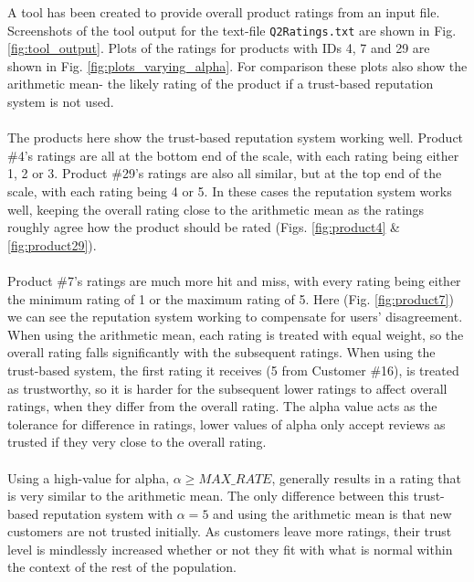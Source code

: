 \documentclass{article}
\begin{document}
A tool has been created to provide overall product ratings from an input file. Screenshots of the tool output for the text-file \texttt{Q2Ratings.txt} are shown in Fig. \ref{fig:tool_output}.
Plots of the ratings for products with IDs 4, 7 and 29 are shown in Fig. \ref{fig:plots_varying_alpha}. For comparison these plots also show the arithmetic mean- the likely rating of the product if a trust-based reputation system is not used.
\\\\
The products here show the trust-based reputation system working well.
Product \#4's ratings are all at the bottom end of the scale, with each rating being either 1, 2 or 3. 
Product \#29's ratings are also all similar, but at the top end of the scale, with each rating being 4 or 5.
In these cases the reputation system works well, keeping the overall rating close to the arithmetic mean as the ratings roughly agree how the product should be rated (Figs. \ref{fig:product4} \& \ref{fig:product29}).
\\\\
Product \#7's ratings are much more hit and miss, with every rating being either the minimum rating of 1 or the maximum rating of 5.
Here (Fig. \ref{fig:product7}) we can see the reputation system working to compensate for users' disagreement.
When using the arithmetic mean, each rating is treated with equal weight, so the overall rating falls significantly with the subsequent ratings.
When using the trust-based system, the first rating it receives (5 from Customer \#16), is treated as trustworthy, so it is harder for the subsequent lower ratings to affect overall ratings, when they differ from the overall rating.
The alpha value acts as the tolerance for difference in ratings, lower values of alpha only accept reviews as trusted if they very close to the overall rating.
\\\\
Using a high-value for alpha, $\alpha \geqslant MAX\_RATE$, generally results in a rating that is very similar to the arithmetic mean. The only difference between this trust-based reputation system with $\alpha = 5$ and using the arithmetic mean is that new customers are not trusted initially. As customers leave more ratings, their trust level is mindlessly increased whether or not they fit with what is normal within the context of the rest of the population.
\end{document}
